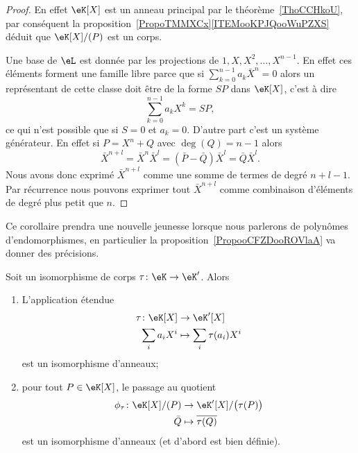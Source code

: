 \begin{proof}
    En effet \( \eK[X]\) est un anneau principal par le théorème~\ref{ThoCCHkoU}, par conséquent la proposition~\ref{PropoTMMXCx}\ref{ITEMooKPJQooWuPZXS} déduit que \( \eK[X]/(P)\) est un corps.

    Une base de \( \eL\) est donnée par les projections de \( 1,X,X^2,\ldots, X^{n-1}\). En effet ces éléments forment une famille libre parce que si \( \sum_{k=0}^{n-1}a_k\bar X^n=0\) alors un représentant de cette classe doit être de la forme \( SP\) dans \( \eK[X]\), c'est à dire
    \begin{equation}
        \sum_{k=0}^{n-1}a_kX^k=SP,
    \end{equation}
    ce qui n'est possible que si \( S=0\) et \( a_k=0\). D'autre part c'est un système générateur. En effet si \( P=X^n+Q\) avec \( \deg(Q)=n-1\) alors
    \begin{equation}
        \bar X^{n+l}=\bar X^n\bar X^l=(\bar P-\bar Q)\bar X^l=\bar Q\bar X^l.
    \end{equation}
    Nous avons donc exprimé \( \bar X^{n+l}\) comme une somme de termes de degré \( n+l-1\). Par récurrence nous pouvons exprimer tout \( \bar X^{n+l}\) comme combinaison d'éléments de degré plus petit que \( n\).
\end{proof}

\begin{normaltext}
    Ce corollaire prendra une nouvelle jeunesse lorsque nous parlerons de polynômes d'endomorphismes, en particulier la proposition~\ref{PropooCFZDooROVlaA} va donner des précisions.
\end{normaltext}

\begin{lemma}        \label{LEMooGRIMooPxCXAZ}
    Soit un isomorphisme de corps \( \tau\colon \eK\to \eK'\). Alors
    \begin{enumerate}
        \item
            L'application étendue
            \begin{equation}
                \begin{aligned}
                    \tau\colon \eK[X]&\to \eK'[X] \\
                    \sum_ia_iX^i&\mapsto \sum_i\tau(a_i)X^i
                \end{aligned}
            \end{equation}
            est un isomorphisme d'anneaux;
        \item
            pour tout \( P\in \eK[X]\), le passage au quotient
            \begin{equation}
                \begin{aligned}
                    \phi_{\tau}\colon \eK[X]/(P)&\to \eK'[X]/\big( \tau(P) \big) \\
                    \bar Q&\mapsto \overline{ \tau(Q) }
                \end{aligned}
            \end{equation}
            est un isomorphisme d'anneaux (et d'abord est bien définie).
    \end{enumerate}
\end{lemma}


